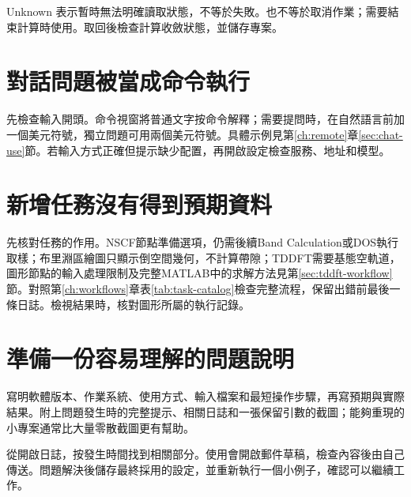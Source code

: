 Unknown 表示暫時無法明確讀取狀態，不等於失敗。也不等於取消作業；需要結束計算時使用。取回後檢查計算收斂狀態，並儲存專案。

\section{對話問題被當成命令執行}

先檢查輸入開頭。命令視窗將普通文字按命令解釋；需要提問時，在自然語言前加一個美元符號，獨立問題可用兩個美元符號。具體示例見第\ref{ch:remote}章\ref{sec:chat-use}節。若輸入方式正確但提示缺少配置，再開啟設定檢查服務、地址和模型。

\section{新增任務沒有得到預期資料}

先核對任務的作用。NSCF節點準備選項，仍需後續Band Calculation或DOS執行取樣；布里淵區繪圖只顯示倒空間幾何，不計算帶隙；TDDFT需要基態空軌道，圖形節點的輸入處理限制及完整MATLAB\regmark{}中的求解方法見第\ref{sec:tddft-workflow}節。對照第\ref{ch:workflows}章表\ref{tab:task-catalog}檢查完整流程，保留出錯前最後一條日誌。檢視結果時，核對圖形所屬的執行記錄。


\section{準備一份容易理解的問題說明}

寫明軟體版本、作業系統、使用方式、輸入檔案和最短操作步驟，再寫預期與實際結果。附上問題發生時的完整提示、相關日誌和一張保留引數的截圖；能夠重現的小專案通常比大量零散截圖更有幫助。

從開啟日誌，按發生時間找到相關部分。使用會開啟郵件草稿，檢查內容後由自己傳送。問題解決後儲存最終採用的設定，並重新執行一個小例子，確認可以繼續工作。

